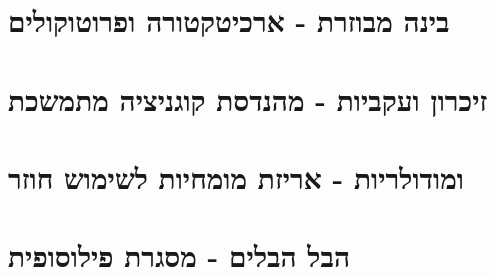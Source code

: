 \documentclass{hebrew-academic-template}
\begin{document}
\newpage
\tableofcontents

\newpage
\part{בינה מבוזרת - ארכיטקטורה ופרוטוקולים}








\newpage
\part{זיכרון ועקביות - מהנדסת קוגניציה מתמשכת}









\newpage
\part{ ומודולריות - אריזת מומחיות לשימוש חוזר}





\newpage
\part{הבל הבלים - מסגרת פילוסופית}






\clearpage







\clearpage
\printenglishbibliography
\end{document}
